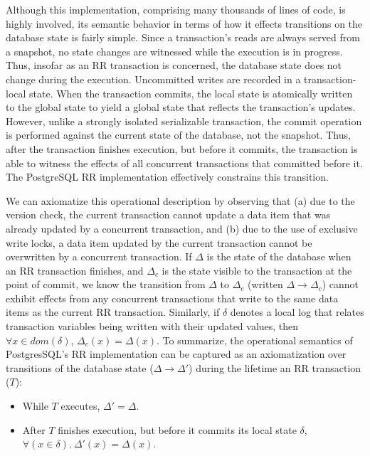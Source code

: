 Although this implementation, comprising many thousands of lines of
code, is highly involved, its semantic behavior in terms of how it
effects transitions on the database state is fairly simple.  Since a
transaction's reads are always served from a snapshot, no state
changes are witnessed while the execution is in progress. Thus,
insofar as an RR transaction is concerned, the database state does not
change during the execution.  Uncommitted writes are recorded in a
transaction-local state.  When the transaction commits, the local
state is atomically written to the global state to yield a global
state that reflects the transaction's updates.  However, unlike a
strongly isolated serializable transaction, the commit operation is
performed against the current state of the database, not the
snapshot. Thus, after the transaction finishes execution, but before
it commits, the transaction is able to witness the effects of all
concurrent transactions that committed before it.  The PostgreSQL RR
implementation effectively constrains this transition.

We can axiomatize this operational description by observing that (a)
due to the version check, the current transaction cannot update a data
item that was already updated by a concurrent transaction, and (b) due
to the use of exclusive write locks, a data item updated by the
current transaction cannot be overwritten by a concurrent transaction.
If $\Delta$ is the state of the database when an RR transaction
finishes, and $\Delta_c$ is the state visible to the transaction at
the point of commit, we know the transition from $\Delta$ to
$\Delta_c$ (written $\Delta \longrightarrow \Delta_c$) cannot exhibit
effects from any concurrent transactions that write to the same data
items as the current RR transaction.  Similarly, if $\delta$ denotes
a local log that relates transaction variables being written with their updated values,
then $\forall x\in\mathit{dom}(\delta)$, $\Delta_c(x) =
\Delta(x)$. To summarize, the operational semantics of PostgresSQL's RR
implementation can be captured as an axiomatization over transitions of
the database state ($\Delta \longrightarrow \Delta'$) during the
lifetime an RR transaction ($T$):
\begin{itemize}
  \item While $T$ executes, $\Delta' = \Delta$.
  \item After $T$ finishes execution, but before it commits its local
    state $\delta$, $\forall(x\in\delta).~\Delta'(x) = \Delta(x)$.
\end{itemize}

